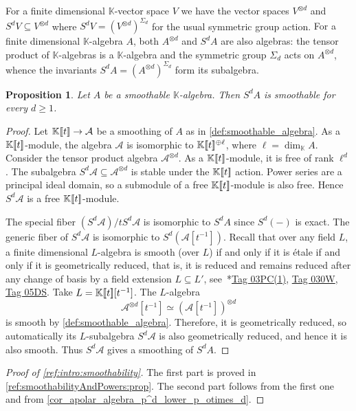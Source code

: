 \documentclass[a4paper,11pt,reqno]{amsart}
\newcommand{\calA}{\mathcal{A}}
\newcommand{\bbK}{\mathbb{K}}
\numberwithin{equation}{section}
\theoremstyle{definition}
\theoremstyle{plain}
\newtheorem{prop}[defn]{Proposition}
\theoremstyle{remark}
\begin{document}
For a {finite dimensional} $\bbK$-vector space $V$ we have the vector spaces $V^{\otimes d}$ and $S^d V
\subseteq V^{\otimes d}$ where $S^d V = (V^{\otimes d})^{\Sigma_d}$ for the
usual symmetric group action. {For a finite dimensional $\bbK$-algebra $A$, both
$A^{\otimes d}$ and $S^d A$ are also algebras:} the tensor product of
$\bbK$-algebras is a $\bbK$-algebra and the symmetric group $\Sigma_d$ acts on
$A^{\otimes d}$, whence the invariants $S^dA = (A^{\otimes d})^{\Sigma_d}$ {form}
its subalgebra.
\begin{prop}\label{ref:smoothabilityAndPowers:prop}
Let $A$ be a smoothable $\bbK$-algebra. Then $S^dA$ is smoothable for every $d\geq 1$.
\end{prop}
\begin{proof}
    Let $\powerseries\to \calA$ be a smoothing of $A$ as in
    \autoref{def:smoothable_algebra}. As a $\powerseries$-module, the algebra
    $\calA$ is isomorphic to $\powerseries^{\oplus \ell}$, where $\ell = \dim_{\bbK}
    A$.
    Consider the tensor product algebra $\calA^{\otimes d}$. As a
    $\powerseries$-module, it is free of rank $\ell^d$.
    The subalgebra $S^d \calA \subseteq \calA^{\otimes d}$ is stable under the
    $\powerseries$ action. Power series are a principal ideal domain, so a
    submodule of a free $\powerseries$-module {is also free}. Hence
    $S^d\calA$ is a free $\powerseries$-module.

The special fiber $(S^d\calA)/tS^d\calA$
is isomorphic to $S^dA$ since $S^d(-)$ is exact. The generic fiber of
$S^d\calA$
is isomorphic to $S^d(\calA[t^{-1}])$.
Recall that over any field $L$, a {finite dimensional} $L$-algebra is smooth
(over $L$) if and only if it is \'etale if and only if it is geometrically
reduced, that is, it is reduced and remains reduced after any change of basis by a
field extension $L\subseteq L'$,
see~\cite{stacks-project}*{\href{https://stacks.math.columbia.edu/tag/03PC}{Tag 03PC(1)},
\href{https://stacks.math.columbia.edu/tag/030W}{Tag 030W}, \href{https://stacks.math.columbia.edu/tag/05DS}{Tag 05DS}}.
Take $L = \powerseries[t^{-1}]$.
The $L$-algebra \[\calA^{\otimes d}[t^{-1}] \simeq (\calA[t^{-1}])^{\otimes d}\]
is smooth by \autoref{def:smoothable_algebra}. Therefore, it is geometrically
reduced, so {automatically its $L$-subalgebra $S^d \calA$ is also geometrically
reduced, and hence it is also smooth.} Thus $S^d\calA$ gives a smoothing of $S^dA$.
\end{proof}
\begin{proof}[Proof of \autoref{ref:intro:smoothability}]
    The first part is proved in \autoref{ref:smoothabilityAndPowers:prop}. {The second part follows from the first one and from}
    \autoref{cor_apolar_algebra_p^d_lower_p_otimes_d}.
\end{proof}
\end{document}
